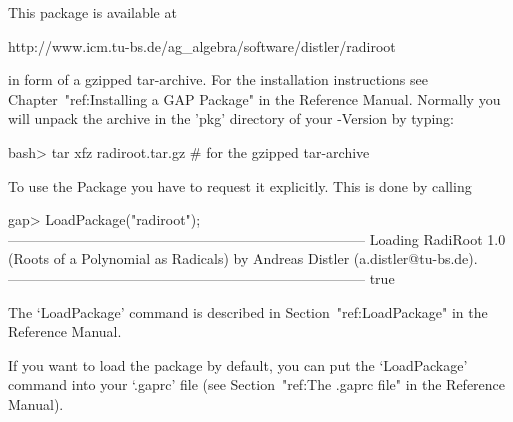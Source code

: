 


This package is available at

\begintt
http://www.icm.tu-bs.de/ag_algebra/software/distler/radiroot
\endtt

in form of a gzipped tar-archive. For the installation instructions see
Chapter~"ref:Installing a GAP Package" in the {\GAP} Reference Manual. 
Normally you will unpack the archive in the 'pkg' directory of your
{\GAP}-Version by typing:

\beginexample
    bash> tar xfz radiroot.tar.gz        # for the gzipped tar-archive
\endexample


To use the {\Radiroot} Package you have to request it explicitly. This  is
done by calling

\beginexample
gap> LoadPackage("radiroot");
-----------------------------------------------------------------------------
Loading  RadiRoot 1.0 (Roots of a Polynomial as Radicals)
by Andreas Distler (a.distler@tu-bs.de).
-----------------------------------------------------------------------------
true
\endexample

The `LoadPackage' command is described  in  Section~"ref:LoadPackage"  in
the {\GAP} Reference Manual.

If you want to load the {\Radiroot} package by default, you  can  put  the
`LoadPackage' command  into  your  `.gaprc'  file  (see  Section~"ref:The
.gaprc file" in the {\GAP} Reference Manual).

